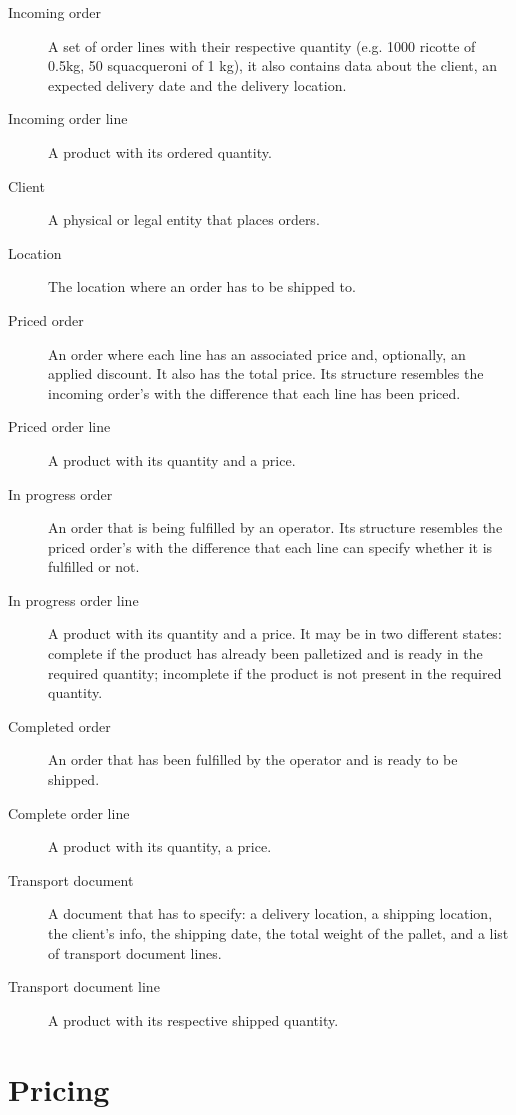 \begin{description}
    \item[Incoming order] A set of order lines with their respective quantity (e.g. 1000 ricotte of 0.5kg, 50 squacqueroni of 1 kg), it also contains data about the client, an expected delivery date and the delivery location.
    \item[Incoming order line] A product with its ordered quantity.
    \item[Client] A physical or legal entity that places orders.
    \item[Location] The location where an order has to be shipped to.
    \item[Priced order] An order where each line has an associated price and, optionally, an applied discount. It also has the total price. Its structure resembles the incoming order's with the difference that each line has been priced.
    \item[Priced order line] A product with its quantity and a price.
    \item[In progress order] An order that is being fulfilled by an operator. Its structure resembles the priced order's with the difference that each line can specify whether it is fulfilled or not.
    \item[In progress order line] A product with its quantity and a price. It may be in two different states: complete if the product has already been palletized and is ready in the required quantity; incomplete if the product is not present in the required quantity.
    \item[Completed order] An order that has been fulfilled by the operator and is ready to be shipped.
    \item[Complete order line] A product with its quantity, a price.
    \item[Transport document] A document that has to specify: a delivery location, a shipping location, the client's info, the shipping date, the total weight of the pallet, and a list of transport document lines.
    \item[Transport document line] A product with its respective shipped quantity. 
\end{description}

\section{Pricing}

